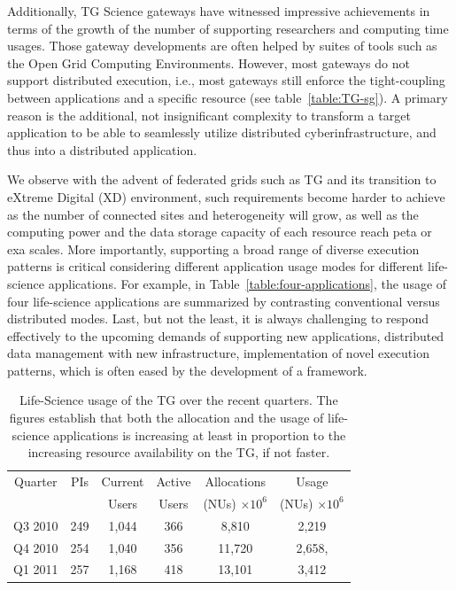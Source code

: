 \documentclass[]{article}
\begin{document}
Additionally, TG Science gateways have witnessed impressive
achievements in terms of the growth of the number of supporting
researchers and computing time usages.  Those gateway developments are
often helped by suites of tools such as the Open Grid Computing
Environments\cite{ogce-2010}.  However, most gateways do not support
distributed execution, i.e., most gateways still enforce the
tight-coupling between applications and a specific resource (see
table~\ref{table:TG-sg}).  A primary reason is the additional, not
insignificant complexity to transform a target application to be able
to seamlessly utilize distributed cyberinfrastructure, and thus into a
distributed application.

We observe with the advent of federated grids such as TG and its
transition to eXtreme Digital (XD) environment, such requirements
become harder to achieve as the number of connected sites and
heterogeneity will grow, as well as the computing power and the data
storage capacity of each resource reach peta or exa scales.  More
importantly, supporting a broad range of diverse execution patterns is
critical considering different application usage modes for different
life-science applications.  For example, in
Table~\ref{table:four-applications}, the usage of four life-science
applications are summarized by contrasting conventional versus
distributed modes.  Last, but not the least, it is always challenging
to respond effectively to the upcoming demands of supporting new
applications, distributed data management with new infrastructure,
implementation of novel execution patterns, which is often eased by
the development of a framework.


\begin{table}
 \small
\begin{tabular}{|c|c|c|c|c|c|} 
  \hline  Quarter & PIs & Current & Active & Allocations  & Usage\\
  & & Users  &  Users & (NUs) $\times 10^6$& (NUs) $\times 10^6$ \\ \hline
  Q3 2010 & 249 & 1,044 & 366 & 8,810   & 2,219  \\ \hline
  Q4 2010 & 254 & 1,040 & 356 & 11,720  & 2,658, \\ \hline
  Q1 2011 & 257 & 1,168 & 418 & 13,101  & 3,412\\ \hline 
\end{tabular} 
\caption{Life-Science usage of the TG over the recent
  quarters. The figures establish that both the  allocation and the
  usage of life-science applications is increasing at least in
  proportion to the increasing resource availability on the TG,
  if not faster.}
 \label{tg2011} 
\end{table}
\end{document}
